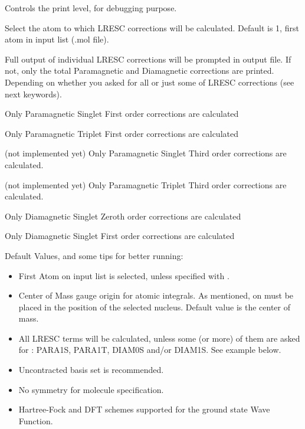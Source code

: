 \begin{list}{}{\itemsep 0.10cm \parsep 0.0cm}
\item[\Key{PRINT}] Controls the print level, for debugging purpose.
\item[\Key{SELECT}] Select the atom to which LRESC corrections will be calculated. Default is 1, first atom in input list (.mol file).
\item[\Key{PRTALL}] Full output of individual LRESC corrections will be prompted in output file. If not, only the total Paramagnetic and Diamagnetic corrections are printed. Depending on whether you asked for all or just some of LRESC corrections (see next keywords).
\item[\Key{PARA1S}] Only Paramagnetic Singlet First order corrections are calculated 
\item[\Key{PARA1T}] Only Paramagnetic Triplet First order corrections are calculated 
\item[\Key{PARA3S}] (not implemented yet) Only Paramagnetic Singlet Third order corrections are calculated. 
\item[\Key{PARA3T}] (not implemented yet) Only Paramagnetic Triplet Third order corrections are calculated. 
\item[\Key{DIAM0S}] Only Diamagnetic Singlet Zeroth order corrections are calculated
\item[\Key{DIAM1S}] Only Diamagnetic Singlet First order corrections are calculated 
\end{list}


Default Values, and some tips for better running:

\begin{center}
\begin{itemize}{}{}
\item First Atom on input list is selected, unless specified with . 
\item Center of Mass gauge origin for atomic integrals. As mentioned,  on 
 must be placed in the position of the selected nucleus. Default value is the center of mass.
\item All LRESC terms will be calculated, unless some (or more) of them are asked for : PARA1S, PARA1T, DIAM0S and/or DIAM1S. See example below.
\item Uncontracted basis set is recommended. 
\item No symmetry for molecule specification. 
\item Hartree-Fock and DFT schemes supported for the ground state Wave Function.
\end{itemize}
\end{center}


